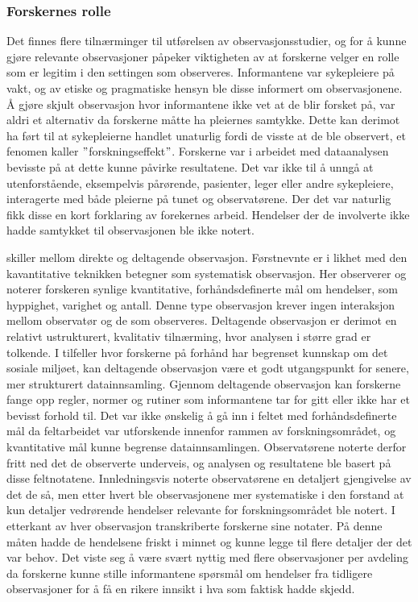\subsubsection{Forskernes rolle}
Det finnes flere tilnærminger til utførelsen av observasjonsstudier, og for å kunne gjøre relevante observasjoner påpeker \citet{Tjora} viktigheten av at forskerne velger en rolle som er legitim i den settingen som observeres. Informantene var sykepleiere på vakt, og av etiske og pragmatiske hensyn ble disse informert om observasjonene. Å gjøre skjult observasjon hvor informantene ikke vet at de blir forsket på, var aldri et alternativ da forskerne måtte ha pleiernes samtykke. Dette kan derimot ha ført til at sykepleierne handlet unaturlig fordi de visste at de ble observert, et fenomen \citet{Tjora} kaller $"$forskningseffekt$"$. Forskerne var i arbeidet med dataanalysen bevisste på at dette kunne påvirke resultatene. Det var ikke til å unngå at utenforstående, eksempelvis pårørende, pasienter, leger eller andre sykepleiere, interagerte med både pleierne på tunet og observatørene. Der det var naturlig fikk disse en kort forklaring av forekernes arbeid. Hendelser der de involverte ikke hadde samtykket til observasjonen ble ikke notert.
 
\noindent
\citet{Greg} skiller mellom direkte og deltagende observasjon. Førstnevnte er i likhet med den kavantitative teknikken \citet{Oates} betegner som systematisk observasjon. Her observerer og noterer forskeren synlige kvantitative, forhåndsdefinerte mål om hendelser, som hyppighet, varighet og antall. Denne type observasjon krever ingen interaksjon mellom observatør og de som observeres.
Deltagende observasjon er derimot en relativt ustrukturert, kvalitativ tilnærming, hvor analysen i større grad er tolkende. I tilfeller hvor forskerne på forhånd har begrenset kunnskap om det sosiale miljøet, kan deltagende observasjon være et godt utgangspunkt for senere, mer strukturert datainnsamling. Gjennom deltagende observasjon kan forskerne fange opp regler, normer og rutiner som informantene tar for gitt eller ikke har et bevisst forhold til.
Det var ikke ønskelig å gå inn i feltet med forhåndsdefinerte mål da feltarbeidet var utforskende innenfor rammen av forskningsområdet, og kvantitative mål kunne begrense datainnsamlingen. Observatørene noterte derfor fritt ned det de observerte underveis, og analysen og resultatene ble basert på disse feltnotatene. Innledningsvis noterte observatørene en detaljert gjengivelse av det de så, men etter hvert ble observasjonene mer systematiske i den forstand at kun detaljer vedrørende hendelser relevante for forskningsområdet ble notert. I etterkant av hver observasjon transkriberte forskerne sine notater. På denne måten hadde de hendelsene friskt i minnet og kunne legge til flere detaljer der det var behov. Det viste seg å være svært nyttig med flere observasjoner per avdeling da forskerne kunne stille informantene spørsmål om hendelser fra tidligere observasjoner for å få en rikere innsikt i hva som faktisk hadde skjedd.
 
